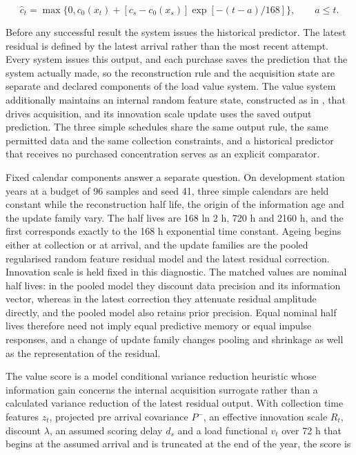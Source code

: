 \documentclass[pdflatex,sn-mathphys-num]{sn-jnl}%
\theoremstyle{thmstyleone}%
\theoremstyle{thmstyletwo}%
\theoremstyle{thmstylethree}%
\begin{document}
\begin{equation}
\widehat c_t=\max\{0,c_0(x_t)+[c_s-c_0(x_s)]\exp[-(t-a)/168]\},\qquad a\le t.
\end{equation}

Before any successful result the system issues the historical predictor. The latest residual is defined by the latest arrival rather than the most recent attempt. Every system issues this output, and each purchase saves the prediction that the system actually made, so the reconstruction rule and the acquisition state are separate and declared components of the load value system. The value system additionally maintains an internal random feature state, constructed as in \citep{rahimi2007}, that drives acquisition, and its innovation scale update uses the saved output prediction. The three simple schedules share the same output rule, the same permitted data and the same collection constraints, and a historical predictor that receives no purchased concentration serves as an explicit comparator.

Fixed calendar components answer a separate question. On development station years at a budget of 96 samples and seed 41, three simple calendars are held constant while the reconstruction half life, the origin of the information age and the update family vary. The half lives are 168 ln 2 h, 720 h and 2160 h, and the first corresponds exactly to the 168 h exponential time constant. Ageing begins either at collection or at arrival, and the update families are the pooled regularised random feature residual model and the latest residual correction. Innovation scale is held fixed in this diagnostic. The matched values are nominal half lives: in the pooled model they discount data precision and its information vector, whereas in the latest correction they attenuate residual amplitude directly, and the pooled model also retains prior precision. Equal nominal half lives therefore need not imply equal predictive memory or equal impulse responses, and a change of update family changes pooling and shrinkage as well as the representation of the residual.

The value score is a model conditional variance reduction heuristic whose information gain concerns the internal acquisition surrogate rather than a calculated variance reduction of the latest residual output. With collection time features $z_t$, projected pre arrival covariance $P^-$, an effective innovation scale $R_t$, discount $\lambda$, an assumed scoring delay $d_s$ and a load functional $v_t$ over 72 h that begins at the assumed arrival and is truncated at the end of the year, the score is
\end{document}
